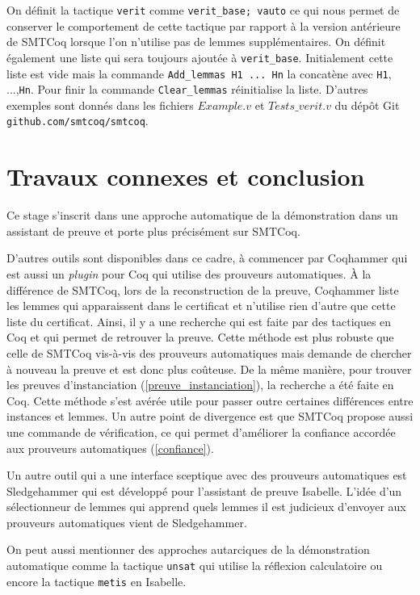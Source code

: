 \documentclass[11pt]{article}
\begin{document}
On définit la tactique \texttt{verit} comme \texttt{verit\_base; vauto} ce qui nous permet de conserver le comportement de cette tactique par rapport à la version antérieure de SMTCoq lorsque l'on n'utilise pas de lemmes supplémentaires. On définit également une liste qui sera toujours ajoutée à \texttt{verit\_base}. Initialement cette liste est vide mais la commande \texttt{Add\_lemmas H1\,...\,Hn} la concatène avec \texttt{H1}, ...,\texttt{Hn}. Pour finir la commande \texttt{Clear\_lemmas} réinitialise la liste. D'autres exemples sont donnés dans les fichiers $Example.v$ et $Tests\_verit.v$ du dépôt Git \texttt{github.com/smtcoq/smtcoq}.


\section{Travaux connexes et conclusion}

Ce stage s'inscrit dans une approche automatique de la démonstration dans un assistant de preuve et porte plus précisément sur SMTCoq. 

D'autres outils sont disponibles dans ce cadre, à commencer par Coqhammer \cite{coqhammer} qui est aussi un \textit{plugin} pour Coq qui utilise des prouveurs automatiques. À la différence de SMTCoq, lors de la reconstruction de la preuve, Coqhammer liste les lemmes qui apparaissent dans le certificat et n'utilise rien d'autre que cette liste du certificat. Ainsi, il y a une recherche qui est faite par des tactiques en Coq et qui permet de retrouver la preuve. Cette méthode est plus robuste que celle  de SMTCoq vis-à-vis des prouveurs automatiques mais demande de chercher à nouveau la preuve et est donc plus coûteuse. De la même manière, pour trouver les preuves d'instanciation (\ref{preuve_instanciation}), la recherche a été faite en Coq. Cette méthode s'est avérée utile pour passer outre certaines différences entre instances et lemmes. Un autre point de divergence est que SMTCoq propose aussi une commande de vérification, ce qui permet d'améliorer la confiance accordée aux prouveurs automatiques (\ref{confiance}).


Un autre outil qui a une interface sceptique avec des prouveurs automatiques est Sledgehammer \cite{sledgehammer_manual} qui est  développé pour l'assistant de preuve Isabelle. L'idée d'un sélectionneur de lemmes qui apprend quels lemmes il est judicieux d'envoyer aux prouveurs automatiques \cite{hol_selector} vient de Sledgehammer.

On peut aussi mentionner des approches autarciques de la démonstration automatique comme la tactique \texttt{unsat} \cite{smt_autarcique} qui utilise la réflexion calculatoire ou encore la tactique \texttt{metis} en Isabelle. \medbreak
\end{document}
